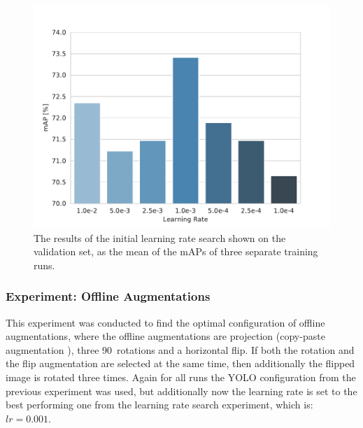 \begin{figure}
\begin{center}
    \includegraphics[width=13cm]{imgs/yolo_lr_experiment.pdf}
    \caption{The results of the initial learning rate search shown on the validation set, as the mean of the mAPs of three separate training runs.}
    \label{fig:yolo_lr_experiment_results}
\end{center}
\end{figure}


\subsubsection{Experiment: Offline Augmentations}

This experiment was conducted to find the optimal configuration of offline augmentations, where the offline augmentations are projection (copy-paste augmentation \cite{copypaste_aug}), three 90\textdegree\ rotations and a horizontal flip.
If both the rotation and the flip augmentation are selected at the same time, then additionally the flipped image is rotated three times.
Again for all runs the YOLO configuration from the previous experiment was used, but additionally now the learning rate is set to the best performing one from the learning rate search experiment, which is: $lr = 0.001$.




